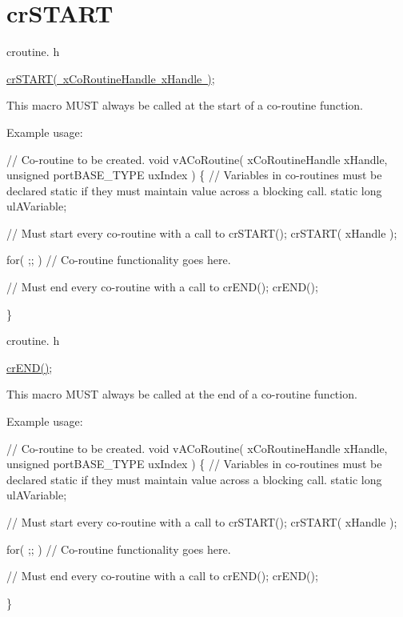 \hypertarget{group__cr_s_t_a_r_t}{}\section{cr\+S\+T\+A\+RT}
\label{group__cr_s_t_a_r_t}
croutine. h 
\begin{DoxyPre}
\mbox{\hyperlink{croutine_8h_a19a57a201a325e8af1207ed68c4aedde}{crSTART( xCoRoutineHandle xHandle )}};\end{DoxyPre}


This macro M\+U\+ST always be called at the start of a co-\/routine function.

Example usage\+: 
\begin{DoxyPre}
// Co-routine to be created.
void vACoRoutine( xCoRoutineHandle xHandle, unsigned portBASE\_TYPE uxIndex )
\{
// Variables in co-routines must be declared static if they must maintain value across a blocking call.
static long ulAVariable;
\begin{DoxyVerb}// Must start every co-routine with a call to crSTART();
crSTART( xHandle );

for( ;; )
{
     // Co-routine functionality goes here.
}

// Must end every co-routine with a call to crEND();
crEND();
\end{DoxyVerb}

\}\end{DoxyPre}


croutine. h 
\begin{DoxyPre}
\mbox{\hyperlink{croutine_8h_ae6038cc976689b50000475ebfc4e2f23}{crEND()}};\end{DoxyPre}


This macro M\+U\+ST always be called at the end of a co-\/routine function.

Example usage\+: 
\begin{DoxyPre}
// Co-routine to be created.
void vACoRoutine( xCoRoutineHandle xHandle, unsigned portBASE\_TYPE uxIndex )
\{
// Variables in co-routines must be declared static if they must maintain value across a blocking call.
static long ulAVariable;
\begin{DoxyVerb}// Must start every co-routine with a call to crSTART();
crSTART( xHandle );

for( ;; )
{
     // Co-routine functionality goes here.
}

// Must end every co-routine with a call to crEND();
crEND();
\end{DoxyVerb}

\}\end{DoxyPre}
 